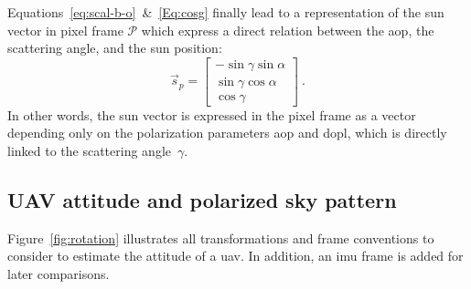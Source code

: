 Equations~\eqref{eq:scal-b-o}~\&~\eqref{Eq:cosg} finally lead to a
representation of the sun vector in pixel frame $\mathcal{P}$ which express a
direct relation between the \gls{aop}, the scattering angle, and the sun
position:
\begin{equation}
  \label{eq:sunp}
  \vec{s}_{p} =
    \begin{bmatrix}
    -\sin\gamma \sin\alpha\\
    \sin\gamma \cos\alpha\\
    \cos\gamma
  \end{bmatrix} \ .
\end{equation}
In other words, the sun vector is expressed in the pixel frame as a vector
depending only on the polarization parameters \gls{aop} and \gls{dopl}, which
is directly linked to the scattering angle~$\gamma$.

\subsection{UAV attitude and polarized sky pattern}
\label{subsec:ps-attitude}

Figure~\ref{fig:rotation} illustrates all transformations and frame conventions
to consider to estimate the attitude of a \gls{uav}. In addition, an \gls{imu}
frame is added for later comparisons.


